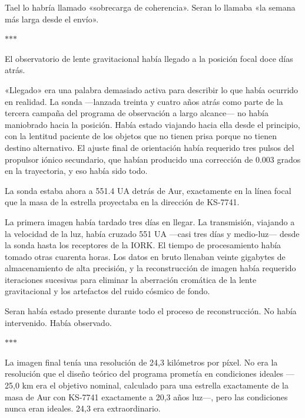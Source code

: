 \documentclass[11pt,a5paper,twoside]{book}
\begin{document}
Tael lo habría llamado «sobrecarga de coherencia». Seran lo llamaba «la semana más larga desde el envío».

\vspace{1.5em}
\begin{center}$\ast$\quad$\ast$\quad$\ast$\end{center}
\vspace{1.5em}

El observatorio de lente gravitacional había llegado a la posición focal doce días atrás.

«Llegado» era una palabra demasiado activa para describir lo que había ocurrido en realidad. La sonda —lanzada treinta y cuatro años atrás como parte de la tercera campaña del programa de observación a largo alcance— no había maniobrado hacia la posición. Había estado viajando hacia ella desde el principio, con la lentitud paciente de los objetos que no tienen prisa porque no tienen destino alternativo. El ajuste final de orientación había requerido tres pulsos del propulsor iónico secundario, que habían producido una corrección de 0.003 grados en la trayectoria, y eso había sido todo.

La sonda estaba ahora a 551.4 UA detrás de Aur, exactamente en la línea focal que la masa de la estrella proyectaba en la dirección de KS-7741.

La primera imagen había tardado tres días en llegar. La transmisión, viajando a la velocidad de la luz, había cruzado 551 UA —casi tres días y medio-luz— desde la sonda hasta los receptores de la IORK. El tiempo de procesamiento había tomado otras cuarenta horas. Los datos en bruto llenaban veinte gigabytes de almacenamiento de alta precisión, y la reconstrucción de imagen había requerido iteraciones sucesivas para eliminar la aberración cromática de la lente gravitacional y los artefactos del ruido cósmico de fondo.

Seran había estado presente durante todo el proceso de reconstrucción. No había intervenido. Había observado.

\vspace{1.5em}
\begin{center}$\ast$\quad$\ast$\quad$\ast$\end{center}
\vspace{1.5em}

La imagen final tenía una resolución de 24,3 kilómetros por píxel. No era la resolución que el diseño teórico del programa prometía en condiciones ideales —25,0 km era el objetivo nominal, calculado para una estrella exactamente de la masa de Aur con KS-7741 exactamente a 20,3 años luz—, pero las condiciones nunca eran ideales. 24,3 era extraordinario.
\end{document}
